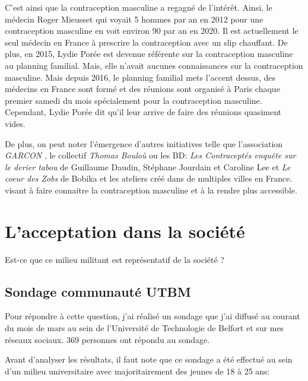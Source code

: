 \documentclass[12pt,a4paper]{report}
\begin{document}
C'est ainsi que la contraception masculine a regagné de l'intérêt. Ainsi, le médecin Roger Mieusset qui voyait 5 hommes par an en 2012 pour une contraception masculine en voit environ 90 par an en 2020.\cite{guillaumedaudinContraceptesEnqueteDernier2022}
Il est actuellement le seul médecin en France à prescrire la contraception avec un slip chauffant.\cite{bobikaCoeurZobs2022}
De plus, en 2015, Lydie Porée est devenue référente sur la contraception masculine au planning familial.
Mais, elle n'avait aucunes connaissances sur la contraception masculine.
Mais depuis 2016, le planning familial mets l'accent dessus, des médecins en France sont formé et des réunions sont organisé à Paris chaque premier samedi du mois spécialement pour la contraception masculine.
Cependant, Lydie Porée dit qu'il leur arrive de faire des réunions quasiment vides. \cite{guillaumedaudinContraceptesEnqueteDernier2022}

De plus, on peut noter l'émergence d'autres initiatives telle que l'association \textit{GARCON} \cite{QuiSommesNous}, le collectif \textit{Thomas Bouloù} \cite{ThomasBoulouInterview} ou les BD: \textit{Les Contraceptés enquête sur le derier tabou} de Guillaume Daudin, Stéphane Jourdain et Caroline Lee \cite{guillaumedaudinContraceptesEnqueteDernier2022} et \textit{Le coeur des Zobs} de Bobika \cite{bobikaCoeurZobs2022} et les ateliers créé dans de multiples villes en France. \cites{ContraceptionMasculineComment2023}{OuNousTrouver}{guillaumedaudinContraceptesEnqueteDernier2022} visant à faire connaitre la contraception masculine et à la rendre plus accessible.

\section{L'acceptation dans la société}

Est-ce que ce milieu militant est représentatif de la société ?

\subsection{Sondage communauté UTBM}
Pour répondre à cette question, j'ai réalisé un sondage que j'ai diffusé au courant du mois de mars au sein de l'Université de Technologie de Belfort et sur mes réseaux sociaux. 369 personnes ont répondu au sondage.

Avant d'analyser les résultats, il faut note que ce sondage a été effectué au sein d'un milieu universitaire avec majoritairement des jeunes de 18 à 25 ans:
\end{document}
